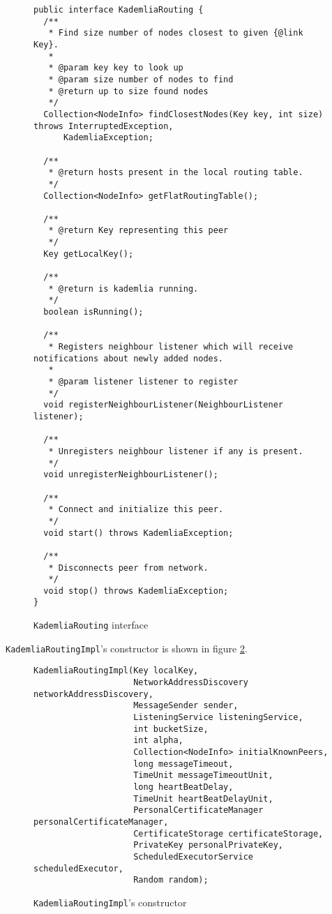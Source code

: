 \begin{figure}[tbp]
\begin{lstlisting}
public interface KademliaRouting {
  /**
   * Find size number of nodes closest to given {@link Key}.
   *
   * @param key key to look up
   * @param size number of nodes to find
   * @return up to size found nodes
   */
  Collection<NodeInfo> findClosestNodes(Key key, int size) throws InterruptedException,
      KademliaException;

  /**
   * @return hosts present in the local routing table.
   */
  Collection<NodeInfo> getFlatRoutingTable();

  /**
   * @return Key representing this peer
   */
  Key getLocalKey();

  /**
   * @return is kademlia running.
   */
  boolean isRunning();

  /**
   * Registers neighbour listener which will receive notifications about newly added nodes.
   *
   * @param listener listener to register
   */
  void registerNeighbourListener(NeighbourListener listener);

  /**
   * Unregisters neighbour listener if any is present.
   */
  void unregisterNeighbourListener();

  /**
   * Connect and initialize this peer.
   */
  void start() throws KademliaException;

  /**
   * Disconnects peer from network.
   */
  void stop() throws KademliaException;
}
\end{lstlisting}
\caption{\texttt{KademliaRouting} interface}
\label{fig:routing_interface}
\end{figure}

{\texttt{KademliaRoutingImpl}'s constructor} is shown in figure
\ref{fig:routing_constr_header}.

\begin{figure}[tbp]
\begin{lstlisting}
KademliaRoutingImpl(Key localKey,
                    NetworkAddressDiscovery networkAddressDiscovery,
                    MessageSender sender,
                    ListeningService listeningService,
                    int bucketSize,
                    int alpha,
                    Collection<NodeInfo> initialKnownPeers,
                    long messageTimeout,
                    TimeUnit messageTimeoutUnit,
                    long heartBeatDelay,
                    TimeUnit heartBeatDelayUnit,
                    PersonalCertificateManager personalCertificateManager,
                    CertificateStorage certificateStorage,
                    PrivateKey personalPrivateKey,
                    ScheduledExecutorService scheduledExecutor,
                    Random random);
\end{lstlisting}
\caption{\texttt{KademliaRoutingImpl}'s constructor}
\label{fig:routing_constr_header}
\end{figure}
